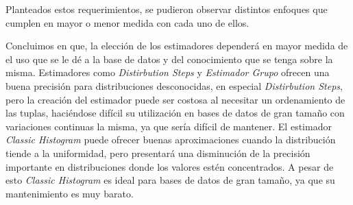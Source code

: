 \documentclass[a4paper, 10pt, twoside]{article}
\begin{document}
Planteados estos requerimientos, se pudieron observar distintos enfoques que cumplen en mayor o menor medida con cada uno de ellos.

Concluimos en que, la elección de los estimadores dependerá en mayor medida de el uso que se le dé a la base de datos y del conocimiento que se tenga sobre la misma. Estimadores como \textit{Distirbution Steps} y \textit{Estimador Grupo} ofrecen una buena precisión para distribuciones desconocidas, en especial \textit{Distirbution Steps}, pero la creación del estimador puede ser costosa al necesitar un ordenamiento de las tuplas, haciéndose difícil su utilización en bases de datos de gran tamaño con variaciones continuas la misma, ya que sería difícil de mantener. El estimador \textit{Classic Histogram} puede ofrecer buenas aproximaciones cuando la distribución tiende a la uniformidad, pero presentará una disminución de la precisión importante en distribuciones donde los valores estén concentrados. A pesar de esto \textit{Classic Histogram} es ideal para bases de datos de gran tamaño, ya que su mantenimiento es muy barato.
\end{document}
